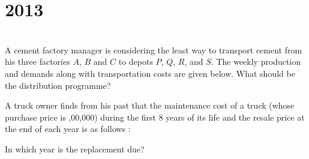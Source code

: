 \section*{2013}
\vspace{-.5cm}
\hrulefill \smallskip\\
 A cement factory manager is considering the least way to transport cement from his three factories $A$, $B$ and $C$ to depots $P$, $Q$, $R$, and $S$. The weekly production and demands along with transportation costs are given below. What should be the distribution programme?
\begin{center}
\end{center}
\myline
{} A truck owner finds from his past that the maintenance cost of a truck (whose purchase price is ,00,000) during the first 8 years of its life and the resale price at the end of each year is as follows :
\vspace{-1em}
\begin{center}
\end{center}
In which year is the replacement due?